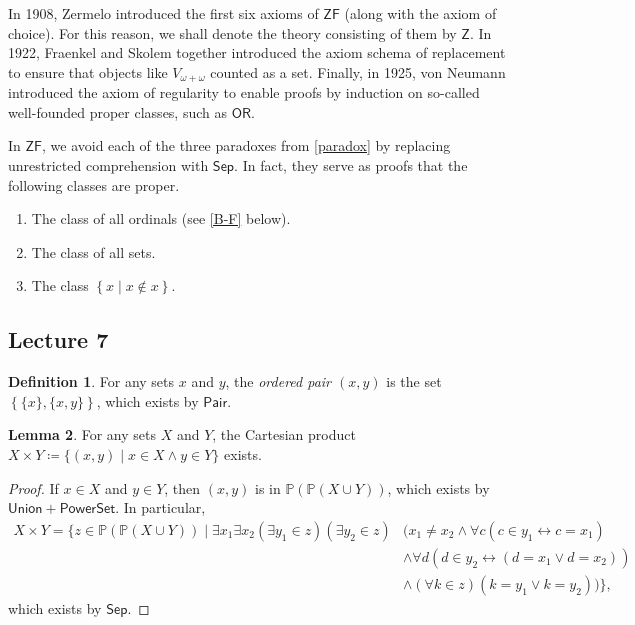 \documentclass[10pt,letterpaper,cm]{nupset}
\theoremstyle{definition}
\newtheorem{definition}{Definition}[subsection]
\theoremstyle{theorem}
\newtheorem{lemma}[definition]{Lemma}
\theoremstyle{remark}
\renewcommand{\P}{\mathbb P}
\newcommand{\1}{\mathbf{1}}
\newcommand{\0}{\vec 0}
\newcommand{\z}{\mathsf{Z}}
\newcommand{\zf}{\mathsf{ZF}}
\newcommand{\ord}{\mathsf{OR}}
\begin{document}
\medskip

In 1908, Zermelo introduced the first six axioms of $\zf$ (along with the axiom of choice). For this reason, we shall denote the theory consisting of them by $\z$. In  1922, Fraenkel and Skolem together introduced the axiom schema of replacement to ensure that objects like $V_{\omega + \omega}$ counted as a set. Finally, in 1925, von Neumann  introduced the axiom of regularity to enable proofs by induction on so-called well-founded proper classes, such as $\ord$.


\medskip

In $\zf$, we avoid each of the three paradoxes from \cref{paradox} by replacing unrestricted comprehension with $\mathsf{Sep}$. In fact, they serve as proofs that the following classes are proper. 
\begin{enumerate}
\item The class of all ordinals (see \cref{B-F} below).
 \item The class of all sets.
 \item The class $\left\{x \mid x \notin x\right\}$.
 \end{enumerate}


\subsection{Lecture 7}

\begin{definition}
For any sets $x$ and $y$, the \textit{ordered pair $\left(x,y\right)$} is the set $\left\{\{x\}, \{x,y\}\right\}$, which exists by $\mathsf{Pair}$.
\end{definition}

\begin{lemma}
 For any sets $X$ and $Y$, the Cartesian product $X \times Y \coloneqq \{\left(x,y\right) \mid x \in X \land y \in Y\}$ exists.
\end{lemma}
\begin{proof}
If $x\in X$ and $y\in Y$, then $\left(x,y\right)$ is in $\P(\P(X \cup Y))$, which exists by $\mathsf{Union} + \mathsf{PowerSet}$. In particular,
\begin{align*}
X \times Y = \{z \in \P(\P(X \cup Y)) \mid 
\exists x_1 \exists x_2 (\exists y_1\in z)(\exists y_2\in z) &
 (x_1\ne x_2 \land \forall c (c\in y_1 \leftrightarrow c=x_1) 
\\ & \land \forall d(d\in y_2 \leftrightarrow (d = x_1 \vee d=x_2))
\\  & \land (\forall k\in z)(k = y_1 \vee k = y_2))   \}
,\end{align*}
which exists by $\mathsf{Sep}$. 
\end{proof}
\end{document}

